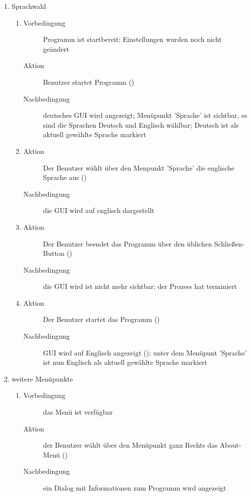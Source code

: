 \begin{enumerate} [label=\bfseries /TF \arabic*0/]
	\item Sprachwahl
	\begin{enumerate}
		\item
		\begin{description}
			\item[Vorbedingung] Programm ist startbereit; Einstellungen wurden noch nicht geändert
			\item[Aktion] Benutzer startet Programm ()
			\item[Nachbedingung] deutsches GUI wird angezeigt; Menüpunkt 'Sprache' ist sichtbar, es sind die Sprachen Deutsch und Englisch wählbar; Deutsch ist als aktuell gewählte Sprache markiert
		\end{description}
		\item
		\begin{description}
			\item[Aktion] Der Benutzer wählt über den Menpunkt 'Sprache' die englische Sprache aus ()
			\item[Nachbedingung] die GUI wird auf englisch dargestellt
		\end{description}
		\item
		\begin{description}
			\item[Aktion] Der Benutzer beendet das Programm über den üblichen Schließen-Button ()
			\item[Nachbedingung] die GUI wird ist nicht mehr sichtbar; der Prozess hat terminiert
		\end{description}
		\item
		\begin{description}
			\item[Aktion] Der Benutzer startet das Programm ()
			\item[Nachbedingung] GUI wird auf Englisch angezeigt (); unter dem Menüpunt 'Sprache' ist nun Englisch als aktuell gewählte Sprache markiert
		\end{description}
	\end{enumerate}

	\item weitere Menüpunkte
	\begin{enumerate}
		\item
		\begin{description}
			\item[Vorbedingung] das Menü ist verfügbar
			\item[Aktion] der Benutzer wählt über den Menüpunkt ganz Rechts das About-Menü ()
			\item[Nachbedingung] ein Dialog mit Informationen zum Programm wird angezeigt
		\end{description}
	\end{enumerate}
\end{enumerate}
